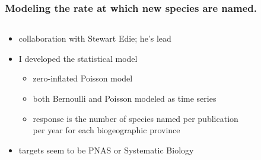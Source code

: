 \documentclass{beamer}
\begin{document}
\begin{frame}
  \frametitle{Modeling the rate at which new species are named.}
  \begin{columns}
    \begin{column}{0.5\textwidth}
      \begin{itemize}
        \item collaboration with Stewart Edie; he's lead
        \item I developed the statistical model
          \begin{itemize}
            \item zero-inflated Poisson model 
            \item both Bernoulli and Poisson modeled as time series
            \item response is the number of species named per publication \\per year for each biogeographic province
          \end{itemize}
        \item targets seem to be PNAS or Systematic Biology
      \end{itemize}
    \end{column}
    \begin{column}{0.5\textwidth}
      \begin{center}

\end{center}
\end{column}
\end{columns}
\end{frame}
\end{document}
